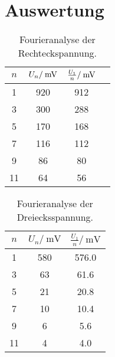 \section{Auswertung}
\label{sec:Auswertung}
\begin{table}
	\centering
	\begin{tabular}{S[table-format=2.0] S[table-format=3.0] S[table-format=3.0] S[table-format=3.0]}
	\toprule
{$n$} & {$U_n/\:\si{\milli{\volt}}$} & {$\frac{U_1}{n}/\:\si{\milli{\volt}}$} \\%
	 & 920 & 912\\
 3 & 300 & 288\\
 5 & 170 & 168\\
 7 & 116 & 112\\
 9 &  86 &  80\\
11 &  64 &  56\\
	\bottomrule
	\end{tabular}
	\caption{Fourieranalyse der Rechteckspannung.}
	\label{tab:FA_RE}
\end{table}
 
\begin{table}
	\centering
	\begin{tabular}{S[table-format=2.0] S[table-format=3.1] S[table-format=3.0] }
	\toprule
	{$n$} & {$U_n/\:\si{\milli\volt}$} & {$\frac{U_1}{n}/\:\si{\milli\volt}$} \\%
	 & 580 & 576.0\\
 3 &  63 &  61.6\\
 5 &  21 &  20.8\\
 7 &  10 &  10.4\\
 9 &   6 &   5.6\\
11 &   4 &   4.0\\
	\bottomrule
	\end{tabular}
	\caption{Fourieranalyse der Dreiecksspannung.}
	\label{tab:FA_RE}
\end{table}


